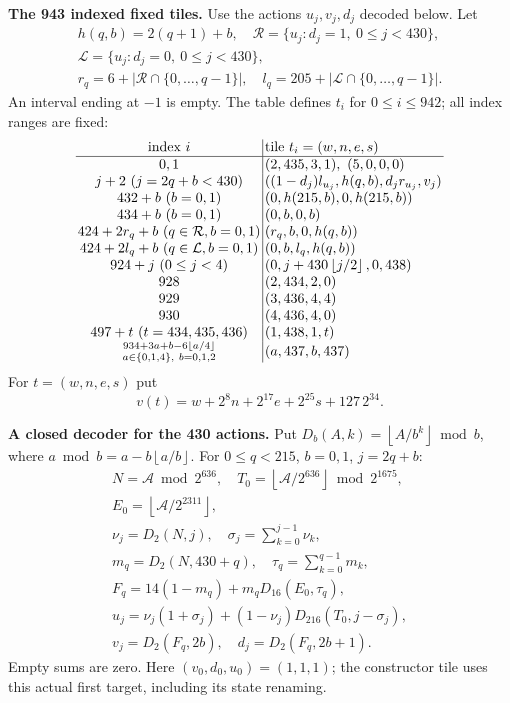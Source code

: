 \documentclass[11pt,letterpaper]{article}
\newcommand{\fl}[1]{\left\lfloor#1\right\rfloor}
\newcommand{\rg}[2]{\{#1,\ldots,#2\}}
\theoremstyle{definition}
\theoremstyle{remark}
\begin{document}
\textbf{The 943 indexed fixed tiles.}
Use the actions $u_j,v_j,d_j$ decoded below. Let
\[
\begin{gathered}
h(q,b)=2(q+1)+b,\quad
\mathcal R=\{u_j:d_j=1,\ 0\le j<430\},\\
\mathcal L=\{u_j:d_j=0,\ 0\le j<430\},\\
r_q=6+|\mathcal R\cap\rg0{q-1}|,\quad
l_q=205+|\mathcal L\cap\rg0{q-1}|.
\end{gathered}
\]
An interval ending at $-1$ is empty. The table defines $t_i$ for
$0\le i\le942$; all index ranges are fixed:
\[
\setlength{\arraycolsep}{1.4pt}\begin{array}{c|l}
\text{index }i&\text{tile }t_i=(w,n,e,s)\\\hline
0,1&(2,435,3,1),\ (5,0,0,0)\\
j+2\ (j=2q+b<430)&((1-d_j)l_{u_j},h(q,b),d_jr_{u_j},v_j)\\
432+b\ (b=0,1)&(0,h(215,b),0,h(215,b))\\
434+b\ (b=0,1)&(0,b,0,b)\\
424+2r_q+b\ (q\in\mathcal R,b=0,1)&(r_q,b,0,h(q,b))\\
424+2l_q+b\ (q\in\mathcal L,b=0,1)&(0,b,l_q,h(q,b))\\
924+j\ (0\le j<4)&(0,j+430\fl{j/2},0,438)\\
928&(2,434,2,0)\\
929&(3,436,4,4)\\
930&(4,436,4,0)\\
497+t\ (t=434,435,436)&(1,438,1,t)\\
\substack{934+3a+b-6\fl{a/4}\\a\in\{0,1,4\},\ b=0,1,2}&(a,437,b,437)
\end{array}
\]
For $t=(w,n,e,s)$ put
\[
v(t)=w+2^8n+2^{17}e+2^{25}s+127\,2^{34}.
\]

\textbf{A closed decoder for the 430 actions.}
Put $D_b(A,k)=\fl{A/b^k}\bmod b$, where
$a\bmod b=a-b\fl{a/b}$. For $0\le q<215$, $b=0,1$, $j=2q+b$:
\[
\begin{gathered}
N=\mathcal A\bmod2^{636},\quad
T_0=\fl{\mathcal A/2^{636}}\bmod2^{1675},\\
E_0=\fl{\mathcal A/2^{2311}},\\
\nu_j=D_2(N,j),\quad \sigma_j=\sum_{k=0}^{j-1}\nu_k,\\
m_q=D_2(N,430+q),\quad \tau_q=\sum_{k=0}^{q-1}m_k,\\
F_q=14(1-m_q)+m_qD_{16}(E_0,\tau_q),\\
u_j=\nu_j(1+\sigma_j)+(1-\nu_j)D_{216}(T_0,j-\sigma_j),\\
v_j=D_2(F_q,2b),\quad d_j=D_2(F_q,2b+1).
\end{gathered}
\]
Empty sums are zero. Here $(v_0,d_0,u_0)=(1,1,1)$; the constructor tile
uses this actual first target, including its state renaming.
\end{document}
